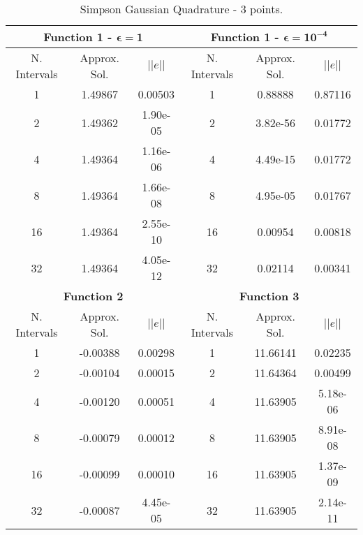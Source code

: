 \begin{table}[H]
    \centering
    \caption{Simpson Gaussian Quadrature - 3 points.}
    \begin{tabular}{ccc|ccc}
    \hline
    \multicolumn{3}{c}{\textbf{Function 1  -} $\bm{\epsilon = 1}$} & \multicolumn{3}{c}{\textbf{Function 1 -} $\bm{\epsilon = 10^{-4}}$} \\ \hline
    N. Intervals & Approx. Sol. & $|| e ||$ & N. Intervals & Approx. Sol. & $|| e ||$ \\ \hline
    1 & 1.49867 & 0.00503 & 1 & 0.88888 & 0.87116 \\
    2 & 1.49362 & 1.90e-05 & 2 & 3.82e-56 & 0.01772 \\
    4 & 1.49364 & 1.16e-06 & 4 & 4.49e-15 & 0.01772 \\
    8 & 1.49364 & 1.66e-08 & 8 & 4.95e-05 & 0.01767 \\
    16 & 1.49364 & 2.55e-10 & 16 & 0.00954 & 0.00818  \\
    32 & 1.49364 & 4.05e-12 & 32 & 0.02114 & 0.00341 \\ \hline
    \multicolumn{3}{c}{\textbf{Function 2}} & \multicolumn{3}{c}{\bf{Function 3}} \\ \hline
    N. Intervals & Approx. Sol. & $|| e ||$ & N. Intervals & Approx. Sol. & $|| e ||$ \\ \hline
    1 & -0.00388 & 0.00298 & 1 & 11.66141&  0.02235 \\
    2 & -0.00104 & 0.00015 & 2 & 11.64364 & 0.00499 \\
    4 & -0.00120 & 0.00051 & 4 & 11.63905 & 5.18e-06 \\ 
    8 & -0.00079 & 0.00012 & 8 & 11.63905 & 8.91e-08 \\
    16 & -0.00099 & 0.00010 & 16 & 11.63905 & 1.37e-09 \\ 
    32 & -0.00087 & 4.45e-05 & 32 & 11.63905 & 2.14e-11 \\ \hline
    \end{tabular}
\end{table}

